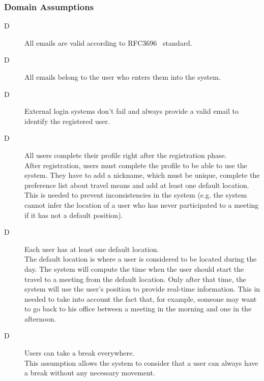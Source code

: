 \subsubsection{Domain Assumptions}

\begin{description}

\item[D\thecountDom] All emails are valid according to RFC3696~\cite{RFC3696} standard.

\item[D\thecountDom] All emails belong to the user who enters them into the system.

\item[D\thecountDom] External login systems don’t fail and always provide a valid email to identify the registered user.

\item[D\thecountDom] All users complete their profile right after the registration phase. \\ [0.1cm]
After registration, users must complete the profile to be able to use the system. They have to add a nickname, which must be unique, complete the preference list about travel means and add at least one default location. This is needed to prevent inconsistencies in the system (e.g. the system cannot infer the location of a user who has never participated to a meeting if it has not a default position).

\item[D\thecountDom] Each user has at least one default location. \\ [0.1cm]
The default location is where a user is considered to be located during the day. The system will compute the time when the user should start the travel to a meeting from the default location. Only after that time, the system will use the user's position to provide real-time information. This in needed to take into account the fact that, for example, someone may want to go back to his office between a meeting in the morning and one in the afternoon.

\item[D\thecountDom] Users can take a break everywhere. \\ [0.1cm]
This assumption allows the system to consider that a user can always have a break without any necessary movement.


\end{description}
